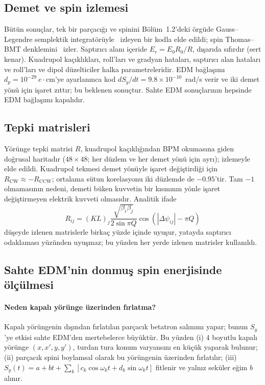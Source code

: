 \documentclass[11pt,a4paper]{article}
\begin{document}
\subsection{Demet ve spin izlemesi}
Bütün sonuçlar, tek bir parçacığı ve spinini Bölüm~1.2'deki örgüde Gauss--Legendre semplektik
integratörüyle~\cite{hairer} izleyen bir kodla elde edildi; spin Thomas--BMT denklemini~\cite{bmt1959}
izler. Saptırıcı alanı içeride $E_r=E_0R_0/R$, dışarıda sıfırdır (sert kenar). Kuadrupol kaçıklıkları,
roll'ları ve gradyan hataları, saptırıcı alan hataları ve roll'ları ve dipol düzelticiler halka
parametreleridir. EDM bağlaşımı $d_p=10^{-29}~e\cdot$cm'ye ayarlanınca kod $dS_y/dt=9.8\times10^{-10}$~rad/s
verir ve iki demet yönü için işaret zıttır; bu beklenen sonuçtur. Sahte EDM sonuçlarının hepsinde EDM
bağlaşımı kapalıdır.

\subsection{Tepki matrisleri}
Yörünge tepki matrisi $R$, kuadrupol kaçıklığından BPM okumasına giden doğrusal haritadır ($48\times48$;
her düzlem ve her demet yönü için ayrı); izlemeyle elde edildi. Kuadrupol tekmesi demet yönüyle işaret
değiştirdiği için $R_\text{CW}\approx-R_\text{CCW}$; ortalama sütun korelasyonu iki düzlemde de $-0.95$'tir.
Tam $-1$ olmamasının nedeni, demeti büken kuvvetin bir kısmının yönle işaret değiştirmeyen elektrik kuvveti
olmasıdır. Analitik ifade
\begin{equation}
R_{ij}=(KL)_j\frac{\sqrt{\beta_i\beta_j}}{2\sin\pi Q}\cos(|\Delta\psi_{ij}|-\pi Q)
\label{eq:R}
\end{equation}
düşeyde izlenen matrislerle birkaç yüzde içinde uyuşur, yatayda saptırıcı odaklaması yüzünden uyuşmaz; bu
yüzden her yerde izlenen matrisler kullanıldı.

\subsection{Sahte EDM'nin donmuş spin enerjisinde ölçülmesi}\label{sec:donmus}
\paragraph{Neden kapalı yörünge üzerinden fırlatma?} Kapalı yörüngenin dışından fırlatılan parçacık
betatron salınımı yapar; bunun $S_y$'ye etkisi sahte EDM'den mertebelerce büyüktür. Bu yüzden (i) 4 boyutlu
kapalı yörünge $(x,x',y,y')$, turdan tura konum varyansını en küçük yaparak bulunur; (ii) parçacık spini
boylamsal olarak bu yörüngenin üzerinden fırlatılır; (iii) $S_y(t)=a+bt+\sum_k[c_k\cos\omega_kt+d_k\sin\omega_kt]$
fitlenir ve yalnız seküler eğim $b$ alınır.
\end{document}
